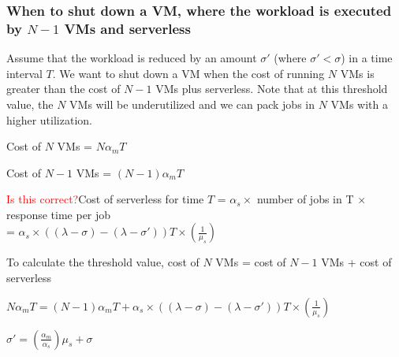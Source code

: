 \documentclass[letter,11pt]{article}
\newcommand{\red}[1]{\textcolor{red}{#1}}
\begin{document}
\subsubsection{When to shut down a VM, where the workload is executed by $N-1$ VMs and serverless}

Assume that the workload is reduced by an amount $\sigma'$ (where $\sigma' < \sigma$) in a time interval $T$. We want to shut down a VM when the cost of running $N$ VMs is greater than the cost of $N-1$ VMs plus serverless. Note that at this threshold value, the $N$ VMs will be underutilized and we can pack jobs in $N$ VMs with a higher utilization.

Cost of $N$ VMs = $N \alpha_m T$

Cost of $N-1$ VMs = $(N-1)\alpha_m T$

\red{Is this correct?}Cost of serverless for time $T$ = $\alpha_s \times$ number of jobs in T $\times$ response time per job \\ 
= $\alpha_s \times ((\lambda - \sigma) - (\lambda - \sigma')) T \times (\frac{1}{\mu_s})$ 

To calculate the threshold value, cost of $N$ VMs = cost of $N-1$ VMs + cost of serverless

$N \alpha_m T= (N-1)\alpha_m T + \alpha_s \times ((\lambda - \sigma) - (\lambda - \sigma')) T \times (\frac{1}{\mu_s})$

$\sigma' = (\frac{\alpha_m}{\alpha_s}) \mu_s + \sigma$
\end{document}
